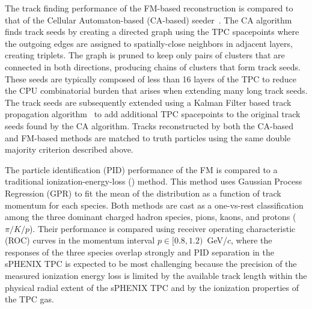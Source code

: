 \documentclass[aps,physrev,twocolumn,superscriptaddress]{revtex4-2}
\begin{document}
The track finding performance of the FM-based reconstruction is compared to that of the Cellular Automaton-based (CA-based) seeder~\cite{Osborn:2021zlr}. The CA algorithm finds track seeds by creating a directed graph using the TPC spacepoints where the outgoing edges are assigned to spatially-close neighbors in adjacent layers, creating triplets. The graph is pruned to keep only pairs of clusters that are connected in both directions, producing chains of clusters that form track seeds. These seeds are typically composed of less than 16 layers of the TPC to reduce the CPU combinatorial burden that arises when extending many long track seeds. The track seeds are subsequently extended using a Kalman Filter based track propagation algorithm~\cite{Fruhwirth:1987fm} to add additional TPC spacepoints to the original track seeds found by the CA algorithm. Tracks reconstructed by both the CA-based and FM-based methods are matched to truth particles using the same double majority criterion described above. 




The particle identification (PID) performance of the FM is compared to a traditional ionization-energy-loss (\dedx) method. This method uses Gaussian Process Regression (GPR) to fit the mean of the \dedx distribution as a function of track momentum for each species. Both methods are cast as a
one-vs-rest classification among the three dominant charged hadron species, pions, kaons, and protons ($\pi/K/p$). Their performance is compared using receiver operating characteristic (ROC) curves in the momentum interval $p \in [0.8,1.2)$~GeV/$c$, where the \dedx{} responses of the three species overlap strongly and PID separation in the sPHENIX TPC is expected to be most challenging because the precision of the measured ionization energy loss is limited by the available track length within the physical radial extent of the sPHENIX TPC and by the ionization properties of the TPC gas.
\end{document}
